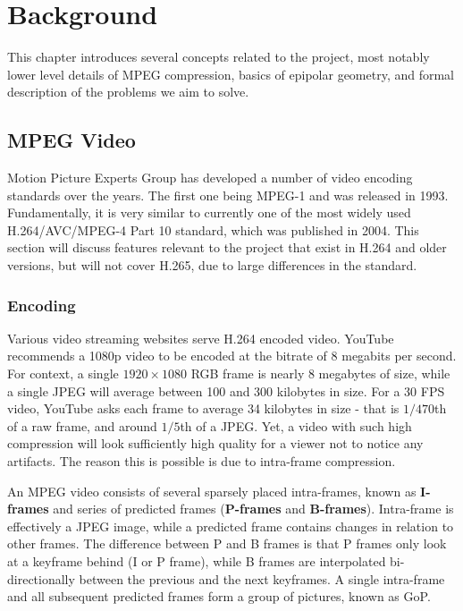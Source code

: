 \documentclass[11pt,english]{report}
\begin{document}
\chapter{Background}

This chapter introduces several concepts related to the project, most notably lower level details of MPEG compression, basics of epipolar geometry, and formal description of the problems we aim to solve.

\section{MPEG Video}

Motion Picture Experts Group has developed a number of video encoding standards over the years. The first one being MPEG-1 and was released in 1993. Fundamentally, it is very similar to currently one of the most widely used H.264/AVC/MPEG-4 Part 10 standard, which was published in 2004. This section will discuss features relevant to the project that exist in H.264 and older versions, but will not cover H.265, due to large differences in the standard.

\subsection{Encoding}

Various video streaming websites serve H.264 encoded video. YouTube recommends a 1080p video to be encoded at the bitrate of 8 megabits per second\cite{youtube}. For context, a single $1920 \times 1080$ RGB frame is nearly 8 megabytes of size, while a single JPEG will average between 100 and 300 kilobytes in size. For a 30 FPS video, YouTube asks each frame to average 34 kilobytes in size - that is $1/470$th of a raw frame, and around $1/5$th of a JPEG. Yet, a video with such high compression will look sufficiently high quality for a viewer not to notice any artifacts. The reason this is possible is due to intra-frame compression.

An MPEG video consists of several sparsely placed intra-frames, known as \textbf{I-frames} and series of predicted frames (\textbf{P-frames} and \textbf{B-frames}). Intra-frame is effectively a JPEG image, while a predicted frame contains changes in relation to other frames. The difference between P and B frames is that P frames only look at a keyframe behind (I or P frame), while B frames are interpolated bi-directionally between the previous and the next keyframes. A single intra-frame and all subsequent predicted frames form a group of pictures, known as GoP.
\end{document}
